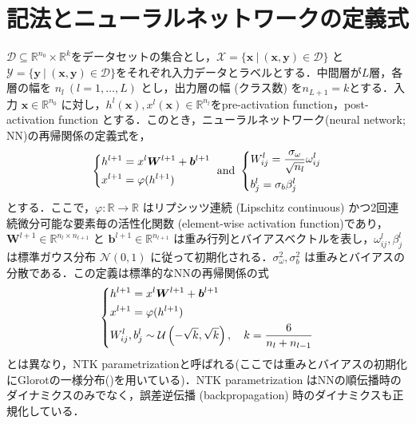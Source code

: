 \section{記法とニューラルネットワークの定義式}
\label{notation}
$\mathcal{D} \subseteq \mathbb{R}^{n_0} \times \mathbb{R}^{k}$をデータセットの集合とし，$\mathcal{X}=\{\bm{x} \ | \ (\bm{x},\bm{y}) \in \mathcal{D}\}$ と $\mathcal{Y}=\{\bm{y} \ | \ (\bm{x},\bm{y}) \in \mathcal{D}\}$をそれぞれ入力データとラベルとする．中間層が$L$層，各層の幅を $n_l  \ (l=1,\ldots,L)$ とし，出力層の幅 (クラス数) を$n_{L+1}=k$とする．入力 $\bm{x} \in \mathbb{R}^{n_0}$ に対し，$h^{l}(\bm{x}), x^{l}(\bm{x}) \in \mathbb{R}^{n_l}$をpre-activation function，post-activation function とする．このとき，ニューラルネットワーク(neural network; NN)の再帰関係の定義式を，
\begin{align}
\label{ntk_parametrization}
    \begin{dcases}
        h^{l+1} = x^{l}\bm{W}^{l+1} + \bm{b}^{l+1} \\
        x^{l+1} = \varphi(h^{l+1})
    \end{dcases}
    \mbox{ and }
    \begin{dcases}
        W_{ij}^{l} = \dfrac{\sigma_{\omega}}{\sqrt{n_l}}\omega_{ij}^{l} \\
        b_{j}^{l} = \sigma_b \beta_{j}^{l}
    \end{dcases}
\end{align}
とする．ここで，$\varphi:\mathbb{R} \rightarrow \mathbb{R}$ はリプシッツ連続 (Lipschitz continuous) かつ2回連続微分可能な要素毎の活性化関数 (element-wise activation function)であり，$\bm{W}^{l+1} \in \mathbb{R}^{n_{l} \times n_{l+1}}$ と $\bm{b}^{l+1} \in \mathbb{R}^{n_{l+1}}$ は重み行列とバイアスベクトルを表し，$\omega_{ij}^{l},\beta_{j}^{l}$ は標準ガウス分布 $\mathcal{N}(0, 1)$ に従って初期化される．$\sigma_{\omega}^2, \sigma_{b}^2$ は重みとバイアスの分散である．この定義は標準的なNNの再帰関係の式
\begin{align}
    \begin{dcases}
        h^{l+1} = x^{l}\bm{W}^{l+1} + \bm{b}^{l+1} \\
        x^{l+1} = \varphi(h^{l+1}) \\
        W_{ij}^{l}, b_{j}^{l} \sim \mathcal{U}\left(-\sqrt{k}, \sqrt{k}\right), \quad k = \dfrac{6}{n_l + n_{l-1}}
    \end{dcases}
\end{align}
とは異なり，NTK parametrizationと呼ばれる(ここでは重みとバイアスの初期化にGlorotの一様分布(\citealp{glorot2010understanding})を用いている)．NTK parametrization はNNの順伝播時のダイナミクスのみでなく，誤差逆伝播 (backpropagation) 時のダイナミクスも正規化している．

